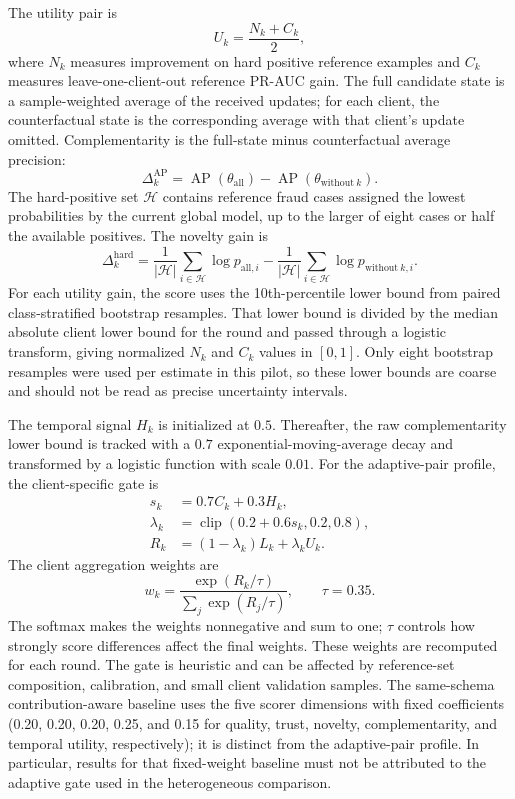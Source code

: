 \documentclass{ieeeaccess}
\begin{document}
The utility pair is
\begin{equation}
  U_k=\frac{N_k+C_k}{2},
\end{equation}
where $N_k$ measures improvement on hard positive reference examples and
$C_k$ measures leave-one-client-out reference PR-AUC gain. The full candidate
state is a sample-weighted average of the received updates; for each client,
the counterfactual state is the corresponding average with that client's
update omitted. Complementarity is the full-state minus counterfactual
average precision:
\begin{equation}
  \Delta_k^{\mathrm{AP}}
  =\operatorname{AP}(\theta_{\mathrm{all}})
  -\operatorname{AP}(\theta_{\mathrm{without}\ k}).
\end{equation}
The hard-positive set $\mathcal{H}$ contains reference fraud cases assigned
the lowest probabilities by the current global model, up to the larger of
eight cases or half the available positives. The novelty gain is
\begin{equation}
  \Delta_k^{\mathrm{hard}}
  =\frac{1}{|\mathcal{H}|}\sum_{i\in\mathcal{H}}
  \log p_{\mathrm{all},i}
  -\frac{1}{|\mathcal{H}|}\sum_{i\in\mathcal{H}}
  \log p_{\mathrm{without}\ k,i}.
\end{equation}
For each utility gain, the score uses the 10th-percentile lower bound from
paired class-stratified bootstrap resamples. That lower bound is divided by
the median absolute client lower bound for the round and passed through a
logistic transform, giving normalized $N_k$ and $C_k$ values in $[0,1]$.
Only eight bootstrap resamples were used per estimate in this pilot, so these
lower bounds are coarse and should not be read as precise uncertainty
intervals.

The temporal signal $H_k$ is initialized at $0.5$. Thereafter, the raw
complementarity lower bound is tracked with a $0.7$ exponential-moving-average
decay and transformed by a logistic function with scale $0.01$. For the
adaptive-pair profile, the client-specific gate is
\begin{align}
  s_k &= 0.7C_k+0.3H_k,\\
  \lambda_k &= \operatorname{clip}(0.2+0.6s_k,0.2,0.8),\\
  R_k &= (1-\lambda_k)L_k+\lambda_kU_k.
\end{align}
The client aggregation weights are
\begin{equation}
  w_k=\frac{\exp(R_k/\tau)}{\sum_j\exp(R_j/\tau)},\qquad \tau=0.35.
\end{equation}
The softmax makes the weights nonnegative and sum to one; $\tau$ controls how
strongly score differences affect the final weights. These weights are
recomputed for each round.
The gate is heuristic and can be affected by reference-set composition,
calibration, and small client validation samples. The same-schema
contribution-aware baseline uses the five scorer dimensions with fixed
coefficients (0.20, 0.20, 0.20, 0.25, and 0.15 for quality, trust, novelty,
complementarity, and temporal utility, respectively); it is distinct from the
adaptive-pair profile. In particular, results for that fixed-weight baseline
must not be attributed to the adaptive gate used in the heterogeneous
comparison.
\end{document}
